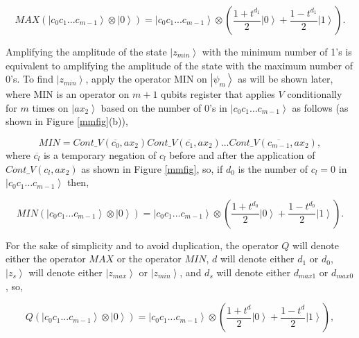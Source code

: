 \documentclass[a4paper]{article}
\begin{document}
\begin{equation}
MAX\left( {\left| {c_0 c_1 ...c_{m - 1} } \right\rangle  \otimes \left| 0 \right\rangle } \right) = \left| {c_0 c_1 ...c_{m - 1} } \right\rangle  \otimes \left( {\frac{{1 + t^{d_1} }}{2}\left| 0 \right\rangle  + \frac{{1 - t^{d_1} }}{2}\left| 1 \right\rangle } \right).
\end{equation}



Amplifying the amplitude of the state $\left| {z_{min} } \right\rangle$ with the minimum number of 
1's is equivalent to amplifying the amplitude of the state with the maximum number of 
0's. To find $\left| {z_{min} } \right\rangle$, apply the operator MIN 
on $\left| {\psi _m } \right\rangle$ as will be shown later, 
where MIN is an operator on $m+1$ qubits register that applies $V$ conditionally 
for $m$ times on $\left|ax_2 \right\rangle$ 
based on the number of 0's in $\left| {c_0 c_1  \ldots c_{m-1} } \right\rangle$ 
as follows (as shown in Figure \ref{mmfig}(b)),

\begin{equation}
MIN = Cont\_V(\overline{c_0} ,ax_2 )Cont\_V(\overline{c_1} ,ax_2 ) \ldots Cont\_V(\overline{c_{m-1}} ,ax_2),
\end{equation}
\noindent
where $\overline{c_l}$ is a temporary negation of $c_l$ before and after the application 
of $Cont\_V(c_l ,ax_2)$ as shown in Figure \ref{mmfig}, 
so, if $d_0$ is the number of $c_l=0$ in $\left| {c_0 c_1  \ldots c_{m-1} } \right\rangle$ then,

\begin{equation}
MIN\left( {\left| {c_0 c_1 ...c_{m - 1} } \right\rangle  \otimes \left| 0 \right\rangle } \right) = \left| {c_0 c_1 ...c_{m - 1} } \right\rangle  \otimes \left( {\frac{{1 + t^{d_0} }}{2}\left| 0 \right\rangle  + \frac{{1 - t^{d_0} }}{2}\left| 1 \right\rangle } \right).
\end{equation}

For the sake of simplicity and to avoid duplication, 
the operator $Q$ will denote either the operator $MAX$ or the operator $MIN$, $d$ will denote either $d_1$ or $d_0$, 
$\left| {z_s } \right\rangle$ will denote either $\left| {z_{max} } \right\rangle$ or $\left| {z_{min} } \right\rangle$, 
and $d_s$ will denote either $d_{max1}$ or $d_{max0}$, so, 

\begin{equation}
Q\left( {\left| {c_0 c_1 ...c_{m - 1} } \right\rangle  \otimes \left| 0 \right\rangle } \right) = \left| {c_0 c_1 ...c_{m - 1} } \right\rangle  \otimes \left( {\frac{{1 + t^{d} }}{2}\left| 0 \right\rangle  + \frac{{1 - t^{d} }}{2}\left| 1 \right\rangle } \right),
\end{equation}
\end{document}
